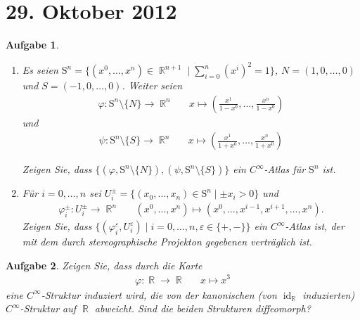 \documentclass[paper=A4, twoside, chapterprefix=true, bibliography=totoc, headsepline]{scrbook}
\let\temp\phi
\let\phi\varphi
\let\varphi\temp
\let\temp\theta
\let\theta\vartheta
\let\vartheta\temp
\let\temp\epsilon
\let\epsilon\varepsilon
\let\varepsilon\temp
\let\temp\rho
\let\rho\varrho
\let\varrho\temp
\DeclareMathOperator{\R}{\mathbb{R}}
\DeclareMathOperator{\id}{id} %
\theoremstyle{plain}
\theoremstyle{nonumberplain}
\theoremstyle{empty}
\theoremstyle{break}
\newtheorem{Aufg}{Aufgabe}
\begin{document}

\section{29. Oktober 2012}
\setcounter{Aufg}{0} %
\setcounter{Loes}{0}

\begin{Aufg}\begin{enumerate}[leftmargin=*,label=\alph*),widest=b]
\item
	Es seien $\mathrm{S}^n=\{(x^0,\dots,x^n)\in \R^{n+1} \mid \sum\limits_{i=0}^n (x^i)^2=1\}$, $N=(1,0,\dots,0)$ und $S=(-1,0,\dots,0)$.  Weiter seien
		\begin{align*}
			\phi: \mathrm{S}^n\setminus\{N\} \to \R^n && x \mapsto \left(\frac{x^1}{1-x^0},\dots,\frac{x^n}{1-x^0}\right)
		\end{align*}
	und
		\begin{align*}
			\psi: \mathrm{S}^n\setminus\{S\} \to \R^n && x \mapsto \left(\frac{x^1}{1+x^0},\dots,\frac{x^n}{1+x^0}\right)
		\end{align*}
	
	Zeigen Sie, dass $\{(\phi,  \mathrm{S}^n\setminus\{N\} ),(\psi,  \mathrm{S}^n\setminus\{S\})\}$ ein $C^\infty$-Atlas für $\mathrm{S}^n$ ist.
\item
	Für $i=0,\dots,n$ sei $U_i^\pm=\{(x_0,\dots,x_n)\in \mathrm{S}^n \mid \pm x_i>0\}$ und 
	\begin{align*}
		\phi_i^\pm :U_i^\pm \to \R^n && (x^0, \dots,x^n) \mapsto (x^0,\dots,x^{i-1},x^{i+1},\dots,x^n).
	\end{align*}
	Zeigen Sie, dass $\big\{(\phi_i^\epsilon,U_i^\epsilon) \mid i=0,\dots,n, \epsilon\in\{+,-\}\big\}$ ein $C^\infty$-Atlas ist, der mit dem durch stereographische Projekton gegebenen verträglich ist.
\end{enumerate}\end{Aufg}

\begin{Aufg}
Zeigen Sie, dass durch die Karte
\begin{align*}
	\phi: \R \to \R && x \mapsto x^3
\end{align*}
eine $C^\infty$-Struktur induziert wird, die von der kanonischen (von $\id_{\R}$ induzierten) $C^\infty$-Struktur auf $\R$ abweicht. 
Sind die beiden Strukturen diffeomorph?
\end{Aufg}
\end{document}
